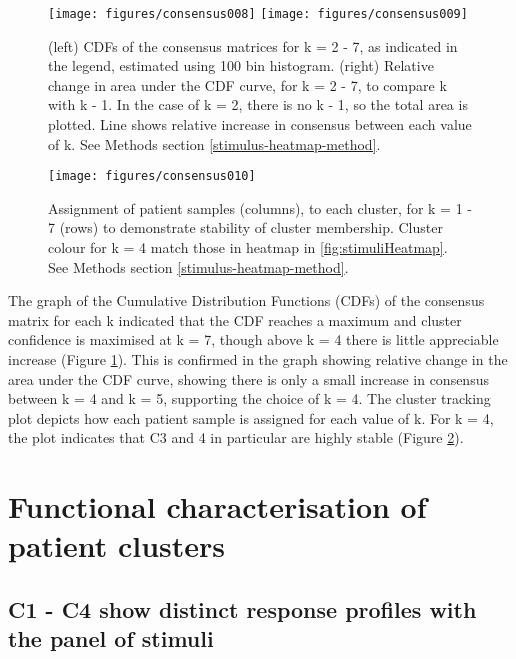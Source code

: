 \documentclass[11pt, a4paper, twosided]{book}
\begin{document}
\begin{figure}

{\centering \texttt{[image: figures/consensus008]} \texttt{[image: figures/consensus009]} 

}

\caption{(left) CDFs of the consensus matrices for k = 2 - 7, as indicated in the legend, estimated using 100 bin histogram. (right) Relative change in area under the CDF curve, for k = 2 - 7, to compare k with k - 1. In the case of k = 2, there is no k - 1, so the total area is plotted. Line shows relative increase in consensus between each value of k. See Methods section \ref{stimulus-heatmap-method}.}\label{fig:consensusClusteringA}
\end{figure}

\begin{figure}

{\centering \texttt{[image: figures/consensus010]} 

}

\caption{Assignment of patient samples (columns), to each cluster, for k = 1 - 7 (rows) to demonstrate stability of cluster membership. Cluster colour for k = 4 match those in heatmap in \ref{fig:stimuliHeatmap}. See Methods section \ref{stimulus-heatmap-method}.}\label{fig:consensusClusteringB}
\end{figure}
The graph of the Cumulative Distribution Functions (CDFs) of the consensus matrix for each k indicated that the CDF reaches a maximum and cluster confidence is maximised at k = 7, though above k = 4 there is little appreciable increase (Figure \ref{fig:consensusClusteringA}). This is confirmed in the graph showing relative change in the area under the CDF curve, showing there is only a small increase in consensus between k = 4 and k = 5, supporting the choice of k = 4. The cluster tracking plot depicts how each patient sample is assigned for each value of k. For k = 4, the plot indicates that C3 and 4 in particular are highly stable (Figure \ref{fig:consensusClusteringB}).

\hypertarget{functional-characterisation-of-patient-clusters}{%
\section{Functional characterisation of patient clusters}\label{functional-characterisation-of-patient-clusters}}

\hypertarget{cluster-responses}{%
\subsection{C1 - C4 show distinct response profiles with the panel of stimuli}\label{cluster-responses}}
\end{document}
